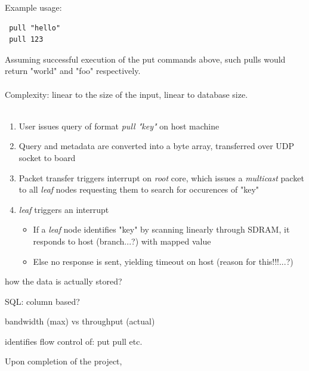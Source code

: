 \noindent
 Example usage:\\
 \begin{lstlisting}
 pull "hello"
 pull 123
 \end{lstlisting}
 Assuming successful execution of the put commands above, such pulls would return "world" and "foo" respectively.\\\\
 Complexity: linear to the size of the input, linear to database size.\\\\

\begin{enumerate}
\item User issues query of format \textit{pull "key"} on host machine
\item Query and metadata are converted into a byte array, transferred over UDP socket to board
\item Packet transfer triggers interrupt on \textit{root} core, which issues a \textit{multicast} packet to all \textit{leaf} nodes requesting them to search for occurences of "key"
\item \textit{leaf} triggers an interrupt
\begin{itemize}
\item If a \textit{leaf} node identifies "key" by scanning linearly through SDRAM, it responds to host (branch...?) with mapped value
\item Else no response is sent, yielding timeout on host (reason for this!!!...?)
\end{itemize}
\end{enumerate}

how the data is actually stored?

SQL:
column based?

bandwidth (max) vs throughput (actual)


identifies
flow control of:
put
pull
etc.

Upon completion of the project, 

